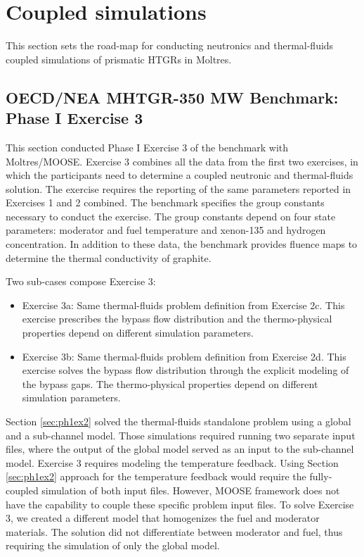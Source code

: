 \section{Coupled simulations}

This section sets the road-map for conducting neutronics and thermal-fluids coupled simulations of prismatic HTGRs in Moltres.

\subsection{OECD/NEA MHTGR-350 MW Benchmark: Phase I Exercise 3}
\label{sec:ph1ex3}

This section conducted Phase I Exercise 3 of the benchmark with Moltres/MOOSE.
Exercise 3 combines all the data from the first two exercises, in which the participants need to determine a coupled neutronic and thermal-fluids solution.
The exercise requires the reporting of the same parameters reported in Exercises 1 and 2 combined.
The benchmark specifies the group constants necessary to conduct the exercise.
The group constants depend on four state parameters: moderator and fuel temperature and xenon-135 and hydrogen concentration.
In addition to these data, the benchmark provides fluence maps to determine the thermal conductivity of graphite.

Two sub-cases compose Exercise 3:
\begin{itemize}
  \item Exercise 3a: Same thermal-fluids problem definition from Exercise 2c. This exercise prescribes the bypass flow distribution and the thermo-physical properties depend on different simulation parameters.
  \item Exercise 3b: Same thermal-fluids problem definition from Exercise 2d. This exercise solves the bypass flow distribution through the explicit modeling of the bypass gaps. The thermo-physical properties depend on different simulation parameters.
\end{itemize}

Section \ref{sec:ph1ex2} solved the thermal-fluids standalone problem using a global and a sub-channel model.
Those simulations required running two separate input files, where the output of the global model served as an input to the sub-channel model.
Exercise 3 requires modeling the temperature feedback.
Using Section \ref{sec:ph1ex2} approach for the temperature feedback would require the fully-coupled simulation of both input files.
However, MOOSE framework does not have the capability to couple these specific problem input files.
To solve Exercise 3, we created a different model that homogenizes the fuel and moderator materials.
The solution did not differentiate between moderator and fuel, thus requiring the simulation of only the global model.

